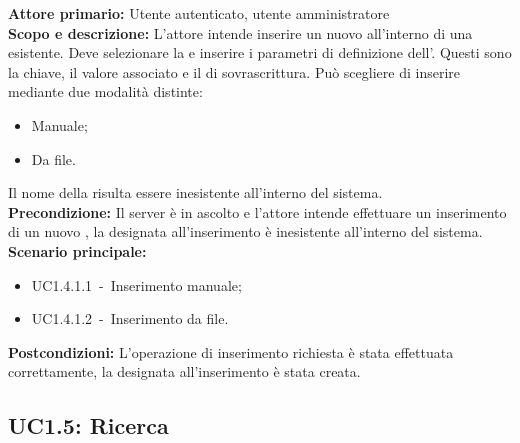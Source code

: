 \documentclass{scalatekids-article}
\begin{document}
\textbf{Attore primario:} Utente autenticato, utente amministratore\\
\textbf{Scopo e descrizione:} L'attore intende inserire un nuovo  all'interno di una  esistente. Deve selezionare la  e inserire i parametri di definizione dell'. Questi sono la chiave, il valore associato e il  di sovrascrittura. Può scegliere di inserire mediante due modalità distinte:
\begin{itemize}
\item Manuale;
\item Da file.
\end{itemize}
Il nome della  risulta essere inesistente all'interno del sistema.\\
\textbf{Precondizione:} Il server è in ascolto e l'attore intende effettuare un inserimento di un nuovo , la  designata all'inserimento è inesistente all'interno del sistema.\\
\textbf{Scenario principale:}
\begin{itemize}
\item UC1.4.1.1\ -\ Inserimento  manuale;
\item UC1.4.1.2\ -\ Inserimento  da file.
\end{itemize}
\textbf{Postcondizioni:} L'operazione di inserimento richiesta è stata effettuata correttamente, la  designata all'inserimento è stata creata.

\subsection{UC1.5: Ricerca}
\end{document}
